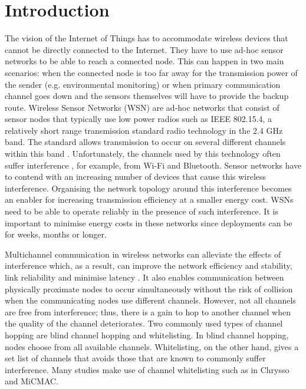 \section{Introduction}
\label{sec:introduction}
The vision of the Internet of Things has to accommodate wireless devices that cannot be directly connected to the Internet. They have to use ad-hoc sensor networks to be able to reach a connected node. This can happen in two main scenarios: when the connected node is too far away for the transmission power of the sender (e.g. environmental monitoring) or when primary communication channel goes down and the sensors themselves will have to provide the backup route.
Wireless Sensor Networks (WSN) are ad-hoc networks that consist of sensor nodes that typically use low power radios such as IEEE 802.15.4, a relatively short range transmission standard radio technology in the 2.4 GHz band. The standard allows transmission to occur on several different channels within this band \cite{ieee802.15.4}. Unfortunately, the channels used by this technology often suffer interference \cite{Boano:2010:MSM:2127940.2127963, ieeeCompare}, for example, from Wi-Fi \cite{ieee_2012, wu} and Bluetooth. Sensor networks have to contend with an increasing number of devices that cause this wireless interference. Organising the network topology around this interference becomes an enabler for increasing transmission efficiency at a smaller energy cost. WSNs need to be able to operate reliably in the presence of such interference. It is important to minimise energy costs in these networks since deployments can be for weeks, months or longer.

Multichannel communication in wireless networks can alleviate the effects of interference which, as a result, can improve the network efficiency and stability, link reliability and minimise latency \cite{watteyne}. It also enables communication between physically proximate nodes to occur simultaneously without the risk of collision when the communicating nodes use different channels. However, not all channels are free from interference; thus, there is a gain to hop to another channel when the quality of the channel deteriorates. Two commonly used types of channel hopping \cite{watteyne} are blind channel hopping and whitelisting. In blind channel hopping, nodes choose from all available channels. 
Whitelisting, on the other hand, gives a set list of channels that avoids those that are known to commonly suffer interference.
Many studies make use of channel whitelisting such as in Chrysso \cite{chrysso} and MiCMAC\cite{micmac}.

